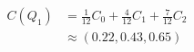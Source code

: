 \documentclass[border=6pt]{standalone}
\begin{document}
\color{black}
\(\displaystyle
\begin{aligned}
C(Q_1) &= \frac{1}{12} C_0 + \frac{4}{12} C_1 + \frac{7}{12} C_2 \\
       &\approx (0.22,0.43,0.65)
\end{aligned}
\)
\end{document}
